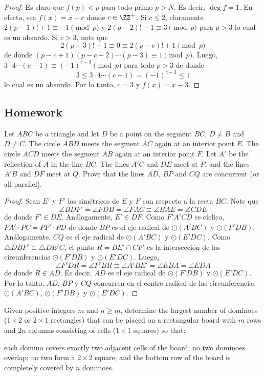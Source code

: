 \begin{proof}
	Es claro que $f(p)<p$ para todo primo $p>N$. Es decir, $\deg f=1$. En efecto, sea $f(x)=x-c$ donde $c\in\ZZ^+$. Si $c\le 2$, claramente $2(p-1)!+1\equiv -1\pmod p$ y $2(p-2)!+1\equiv 3\pmod p$ para $p>3$ lo cual es un absurdo. Si $c>3$, note que
	\[2(p-3)!+1\equiv 0\equiv 2(p-c)!+1\pmod p\]
	de donde $(p-c+1)(p-c+2)\cdots(p-3)\equiv 1\pmod p$. Luego, $3\cdot 4\cdots(c-1)\equiv(-1)^{c-3}\pmod p$ para todo $p>3$ de donde
	\[3\le 3\cdot 4\cdots(c-1)=(-1)^{c-3}\le 1\]
	lo cual es un absurdo. Por lo tanto, $c=3$ y $f(x)=x-3$.
\end{proof}

\subsection{Homework}

\begin{probEG}[RMM 2016/1]
	Let $ABC$ be a triangle and let $D$ be a point on the segment $BC$, $D\ne B$ and $D\ne C$. The circle $ABD$ meets the segment $AC$ again at an interior point $E$. The circle $ACD$ meets the segment $AB$ again at an interior point $F$. Let $A'$ be the reflection of $A$ in the line $BC$. The lines $A'C$ and $DE$ meet at $P$, and the lines $A'B$ and $DF$ meet at $Q$. Prove that the lines $AD$, $BP$ and $CQ$ are concurrent (or all parallel).
\end{probEG}

\begin{proof}
	Sean $E'$ y $F'$ los simétricos de $E$ y $F$ con respecto a la recta $BC$. Note que
	\[\angle BDF'=\angle FDB=\angle FAC\equiv\angle BAE=\angle CDE\]
	de donde $F'\in DE$. Análogamente, $E'\in DF$. Como $F'A'CD$ es cíclico, $PA'\cdot PC=PF'\cdot PD$ de donde $BP$ es el eje radical de $\odot(A'BC)$ y $\odot(F'DB)$. Análogamente, $CQ$ es el eje radical de $\odot(A'BC)$ y $\odot(E'DC)$. Como $\triangle DBF'\cong\triangle DE'C$, el punto $R=BE'\cap CF'$ es la intersección de las circunferencias $\odot(F'DB)$ y $\odot(E'DC)$. Luego,
	\[\angle F'DR=\angle F'BR\equiv\angle A'BE'=\angle EBA=\angle EDA\]
	de donde $R\in AD$. Es decir, $AD$ es el eje radical de $\odot(F'DB)$ y $\odot(E'DC)$. Por lo tanto, $AD$, $BP$ y $CQ$ concurren en el centro radical de las circunferencias $\odot(A'BC)$, $\odot(F'DB)$ y $\odot(E'DC)$.
\end{proof}

\begin{probHR}[RMM 2016/2]
	Given positive integers $m$ and $n\ge m$, determine the largest number of dominoes ($1\times 2$ or $2\times 1$ rectangles) that can be placed on a rectangular board with $m$ rows and $2n$ columns consisting of cells ($1\times 1$ squares) so that:
	\begin{enumerate}[(1)]
		\ii each domino covers exactly two adjacent cells of the board;
		\ii no two dominoes overlap;
		\ii no two form a $2\times 2$ square; and
		\ii the bottom row of the board is completely covered by $n$ dominoes.
	\end{enumerate}
\end{probHR}

